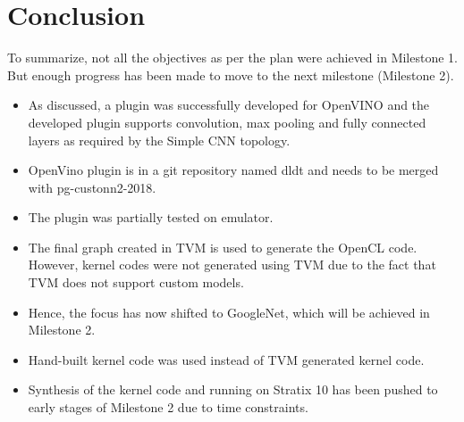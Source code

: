\documentclass[titlepage]{report}
\begin{document}
\chapter{Conclusion}
To summarize, not all the objectives as per the plan were achieved in Milestone 1. But enough progress has been made to move to the next milestone (Milestone 2).
\begin{itemize}
\item As discussed, a plugin was successfully developed for OpenVINO and the developed plugin supports convolution, max pooling and fully connected layers as required by the Simple CNN topology.
\item OpenVino plugin is in a git repository named dldt and needs to be merged with pg-custonn2-2018.

\item The plugin was partially tested on emulator.

\item The final graph created in TVM is used to generate the OpenCL code.
 However, kernel codes were not generated using TVM due to the fact that TVM does not support custom models.
 
 \item Hence, the focus has now shifted to GoogleNet, which will be achieved in Milestone 2.

 
 \item Hand-built kernel code was used instead of TVM generated kernel code.
 
 \item Synthesis of the kernel code and running on Stratix 10 has been pushed to early stages of Milestone 2 due to time constraints.
 



   
\end{itemize}
\end{document}
